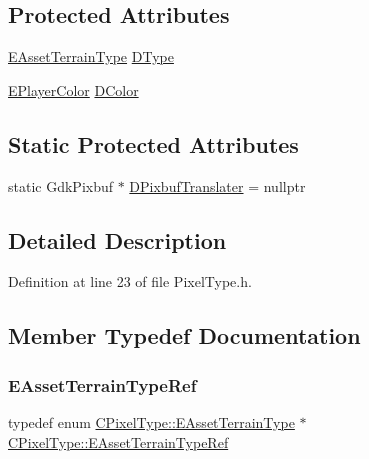 \subsection*{Protected Attributes}
\begin{DoxyCompactItemize}
\item 
\hyperlink{classCPixelType_af06457fd1c2ff34c67ce670e633a10b0}{E\+Asset\+Terrain\+Type} \hyperlink{classCPixelType_aca37f042b510a349e0d3209c73ae51c5}{D\+Type}
\item 
\hyperlink{GameDataTypes_8h_aafb0ca75933357ff28a6d7efbdd7602f}{E\+Player\+Color} \hyperlink{classCPixelType_a474243cf748aee94cfa207659e940b6c}{D\+Color}
\end{DoxyCompactItemize}
\subsection*{Static Protected Attributes}
\begin{DoxyCompactItemize}
\item 
static Gdk\+Pixbuf $\ast$ \hyperlink{classCPixelType_af1243e70d11325b487a215ae190db0a2}{D\+Pixbuf\+Translater} = nullptr
\end{DoxyCompactItemize}


\subsection{Detailed Description}


Definition at line 23 of file Pixel\+Type.\+h.



\subsection{Member Typedef Documentation}
\hypertarget{classCPixelType_aa7603ccb4887263fd6f78d5e84124bae}{}\label{classCPixelType_aa7603ccb4887263fd6f78d5e84124bae} 
\subsubsection{\texorpdfstring{E\+Asset\+Terrain\+Type\+Ref}{EAssetTerrainTypeRef}}
{\footnotesize\ttfamily typedef  enum \hyperlink{classCPixelType_af06457fd1c2ff34c67ce670e633a10b0}{C\+Pixel\+Type\+::\+E\+Asset\+Terrain\+Type} $\ast$ \hyperlink{classCPixelType_aa7603ccb4887263fd6f78d5e84124bae}{C\+Pixel\+Type\+::\+E\+Asset\+Terrain\+Type\+Ref}}



